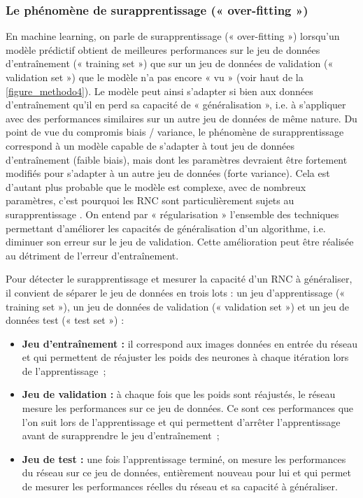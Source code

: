 \subsubsection{Le phénomène de surapprentissage (« over-fitting »)}

En machine learning, on parle de surapprentissage (« over-fitting ») lorsqu’un modèle prédictif obtient de meilleures performances sur le jeu de données d’entraînement (« training set ») que sur un jeu de données de validation (« validation set ») que le modèle n’a pas encore « vu » (voir haut de la \autoref{figure_methodo4}). Le modèle peut ainsi s’adapter si bien aux données d’entraînement qu’il en perd sa capacité de « généralisation », i.e. à s’appliquer avec des performances similaires sur un autre jeu de données de même nature. Du point de vue du compromis biais / variance, le phénomène de surapprentissage correspond à un modèle capable de s’adapter à tout jeu de données d’entraînement (faible biais), mais dont les paramètres devraient être fortement modifiés pour s’adapter à un autre jeu de données (forte variance). Cela est d’autant plus probable que le modèle est complexe, avec de nombreux paramètres, c’est pourquoi les RNC sont particulièrement sujets au surapprentissage \citep{li_gradient_2019}. On entend par « régularisation » l’ensemble des techniques permettant d’améliorer les capacités de généralisation d’un algorithme, i.e. diminuer son erreur sur le jeu de validation. Cette amélioration peut être réalisée au détriment de l’erreur d’entraînement.

Pour détecter le surapprentissage et mesurer la capacité d’un RNC à généraliser, il convient de séparer le jeu de données en trois lots : un jeu d’apprentissage (« training set »), un jeu de données de validation (« validation set ») et un jeu de données test (« test set ») :

\begin{itemize}
    \item \textbf{Jeu d’entraînement :} il correspond aux images données en entrée du réseau et qui permettent de réajuster les poids des neurones à chaque itération lors de l’apprentissage~;
    
    \item \textbf{Jeu de validation :} à chaque fois que les poids sont réajustés, le réseau mesure les performances sur ce jeu de données. Ce sont ces performances que l’on suit lors de l’apprentissage et qui permettent d’arrêter l’apprentissage avant de surapprendre le jeu d’entraînement~;
    
    \item \textbf{Jeu de test :} une fois l’apprentissage terminé, on mesure les performances du réseau sur ce jeu de données, entièrement nouveau pour lui et qui permet de mesurer les performances réelles du réseau et sa capacité à généraliser.
\end{itemize}

